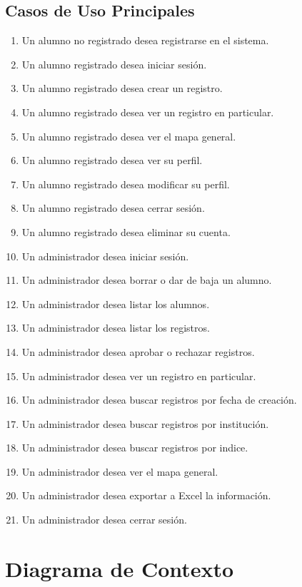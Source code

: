 \subsection{Casos de Uso Principales}

\begin{enumerate}
    \itemsep-1em
    \item Un alumno no registrado desea registrarse en el sistema.
    \item Un alumno registrado desea iniciar sesión.
    \item Un alumno registrado desea crear un registro.
    \item Un alumno registrado desea ver un registro en particular.
    \item Un alumno registrado desea ver el mapa general.
    \item Un alumno registrado desea ver su perfil.
    \item Un alumno registrado desea modificar su perfil.
    \item Un alumno registrado desea cerrar sesión.
    \item Un alumno registrado desea eliminar su cuenta.
    \item Un administrador desea iniciar sesión.
    \item Un administrador desea borrar o dar de baja un alumno.
    \item Un administrador desea listar los alumnos.
    \item Un administrador desea listar los registros.
    \item Un administrador desea aprobar o rechazar registros.
    \item Un administrador desea ver un registro en particular.
    \item Un administrador desea buscar registros por fecha de creación.
    \item Un administrador desea buscar registros por institución.
    \item Un administrador desea buscar registros por indice.
    \item Un administrador desea ver el mapa general.
    \item Un administrador desea exportar a Excel la información.
    \item Un administrador desea cerrar sesión.


\end{enumerate}

\section{Diagrama de Contexto}

